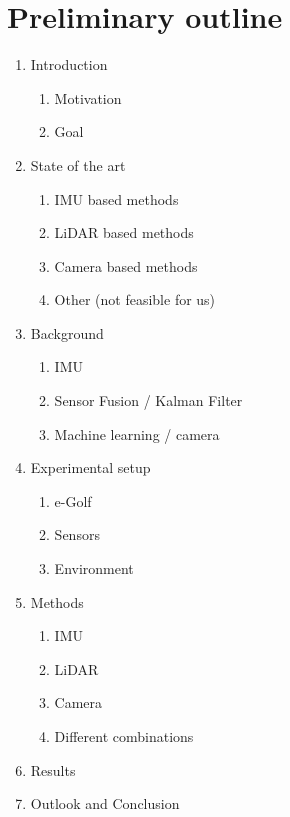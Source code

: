 \documentclass{paper}
\begin{document}
\section{Preliminary outline}
\begin{enumerate}
    \item Introduction
        \begin{enumerate}
            \item Motivation
            \item Goal
        \end{enumerate}
    \item State of the art
        \begin{enumerate}
            \item IMU based methods
            \item LiDAR based methods
            \item Camera based methods
            \item Other (not feasible for us)
        \end{enumerate}
    \item Background
    \begin{enumerate}
        \item IMU
        \item Sensor Fusion / Kalman Filter
        \item Machine learning / camera
    \end{enumerate}
    \item Experimental setup
        \begin{enumerate}
            \item e-Golf
            \item Sensors
            \item Environment
        \end{enumerate}
    \item Methods
    \begin{enumerate}
        \item IMU
        \item LiDAR
        \item Camera
        \item Different combinations
    \end{enumerate}
    \item Results
    \item Outlook and Conclusion
\end{enumerate}

\end{document}
